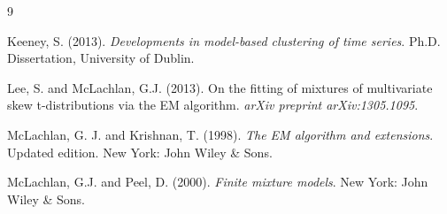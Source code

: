 \documentclass[twoside]{article}
\begin{document}
\begin{thebibliography}{9}






Keeney, S. (2013). \textit{Developments in model-based clustering of time series}. Ph.D. Dissertation, University of Dublin.

Lee, S. and McLachlan, G.J. (2013). On the fitting of mixtures of multivariate skew t-distributions via the EM algorithm. \textit{arXiv preprint arXiv:1305.1095}.



McLachlan, G. J. and Krishnan, T. (1998). \textit{The EM algorithm and extensions}. Updated edition. New York: John Wiley \& Sons.

McLachlan, G.J. and Peel, D. (2000). \textit{Finite mixture models}. New York: John Wiley \& Sons.


\end{thebibliography}
\end{document}
